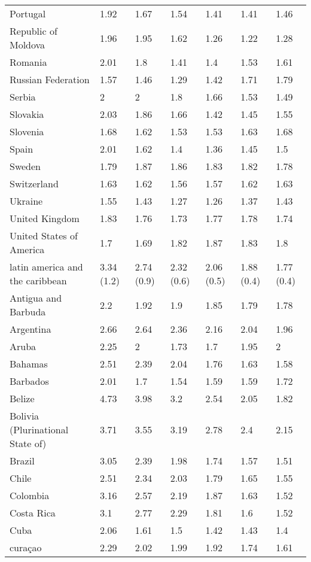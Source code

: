\begin{longtable}[t]{lllllll}
Portugal & 1.92 & 1.67 & 1.54 & 1.41 & 1.41 & 1.46\\
Republic of Moldova & 1.96 & 1.95 & 1.62 & 1.26 & 1.22 & 1.28\\
\addlinespace
Romania & 2.01 & 1.8 & 1.41 & 1.4 & 1.53 & 1.61\\
Russian Federation & 1.57 & 1.46 & 1.29 & 1.42 & 1.71 & 1.79\\
Serbia & 2 & 2 & 1.8 & 1.66 & 1.53 & 1.49\\
Slovakia & 2.03 & 1.86 & 1.66 & 1.42 & 1.45 & 1.55\\
Slovenia & 1.68 & 1.62 & 1.53 & 1.53 & 1.63 & 1.68\\
\addlinespace
Spain & 2.01 & 1.62 & 1.4 & 1.36 & 1.45 & 1.5\\
Sweden & 1.79 & 1.87 & 1.86 & 1.83 & 1.82 & 1.78\\
Switzerland & 1.63 & 1.62 & 1.56 & 1.57 & 1.62 & 1.63\\
Ukraine & 1.55 & 1.43 & 1.27 & 1.26 & 1.37 & 1.43\\
United Kingdom & 1.83 & 1.76 & 1.73 & 1.77 & 1.78 & 1.74\\
\addlinespace
United States of America & 1.7 & 1.69 & 1.82 & 1.87 & 1.83 & 1.8\\
latin america and the caribbean & 3.34 (1.2) & 2.74 (0.9) & 2.32 (0.6) & 2.06 (0.5) & 1.88 (0.4) & 1.77 (0.4)\\
Antigua and Barbuda & 2.2 & 1.92 & 1.9 & 1.85 & 1.79 & 1.78\\
Argentina & 2.66 & 2.64 & 2.36 & 2.16 & 2.04 & 1.96\\
Aruba & 2.25 & 2 & 1.73 & 1.7 & 1.95 & 2\\
\addlinespace
Bahamas & 2.51 & 2.39 & 2.04 & 1.76 & 1.63 & 1.58\\
Barbados & 2.01 & 1.7 & 1.54 & 1.59 & 1.59 & 1.72\\
Belize & 4.73 & 3.98 & 3.2 & 2.54 & 2.05 & 1.82\\
Bolivia (Plurinational State of) & 3.71 & 3.55 & 3.19 & 2.78 & 2.4 & 2.15\\
Brazil & 3.05 & 2.39 & 1.98 & 1.74 & 1.57 & 1.51\\
\addlinespace
Chile & 2.51 & 2.34 & 2.03 & 1.79 & 1.65 & 1.55\\
Colombia & 3.16 & 2.57 & 2.19 & 1.87 & 1.63 & 1.52\\
Costa Rica & 3.1 & 2.77 & 2.29 & 1.81 & 1.6 & 1.52\\
Cuba & 2.06 & 1.61 & 1.5 & 1.42 & 1.43 & 1.4\\
curaçao & 2.29 & 2.02 & 1.99 & 1.92 & 1.74 & 1.61\\

\end{longtable}
